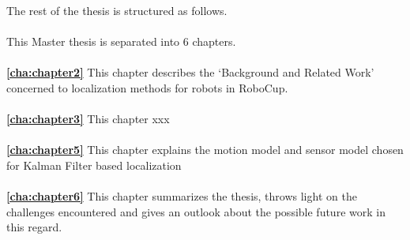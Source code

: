 The rest of the thesis is structured as follows.
\\
\\
\noindent This Master thesis is separated into 6 chapters.
\\
\\
\textbf{\autoref{cha:chapter2}} This chapter describes the `Background and Related Work' concerned to localization methods for robots in RoboCup. 
\\
\\
\textbf{\autoref{cha:chapter3}} This chapter xxx  
\\
\\
\textbf{\autoref{cha:chapter5}} This chapter explains the motion model and sensor model chosen for Kalman Filter based localization 
\\
\\
\textbf{\autoref{cha:chapter6}} This chapter summarizes the thesis, throws light on the challenges encountered and gives an outlook about the possible future work in this regard.
\\
\\
